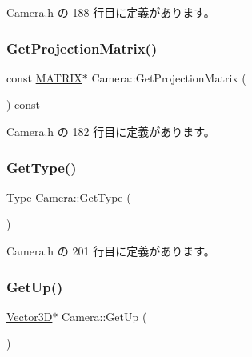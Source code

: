  Camera.\+h の 188 行目に定義があります。

\mbox{\label{class_camera_a473a7a8408bc7a1fdd46d12fa3852846}} 
\subsubsection{\texorpdfstring{Get\+Projection\+Matrix()}{GetProjectionMatrix()}}
{\footnotesize\ttfamily const \mbox{\hyperlink{_vector3_d_8h_a032295cd9fb1b711757c90667278e744}{M\+A\+T\+R\+IX}}$\ast$ Camera\+::\+Get\+Projection\+Matrix (\begin{DoxyParamCaption}{ }\end{DoxyParamCaption}) const\hspace{0.3cm}{\ttfamily [inline]}}



 Camera.\+h の 182 行目に定義があります。

\mbox{\label{class_camera_a3bda45b352bfa163c306c638a2aee1f6}} 
\subsubsection{\texorpdfstring{Get\+Type()}{GetType()}}
{\footnotesize\ttfamily \mbox{\hyperlink{class_camera_a3b0a1f58deca679ac665f61c480d1dcb}{Type}} Camera\+::\+Get\+Type (\begin{DoxyParamCaption}{ }\end{DoxyParamCaption})\hspace{0.3cm}{\ttfamily [inline]}}



 Camera.\+h の 201 行目に定義があります。

\mbox{\label{class_camera_aa767cb71ea435cee1e42effc912904eb}} 
\subsubsection{\texorpdfstring{Get\+Up()}{GetUp()}}
{\footnotesize\ttfamily \mbox{\hyperlink{class_vector3_d}{Vector3D}}$\ast$ Camera\+::\+Get\+Up (\begin{DoxyParamCaption}{ }\end{DoxyParamCaption})\hspace{0.3cm}{\ttfamily [inline]}}



